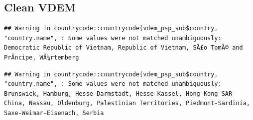 \documentclass[
]{article}
\newenvironment{Shaded}{\begin{snugshade}}{\end{snugshade}}
\newcommand{\CommentTok}[1]{\textcolor[rgb]{0.56,0.35,0.01}{\textit{#1}}}
\newcommand{\DataTypeTok}[1]{\textcolor[rgb]{0.13,0.29,0.53}{#1}}
\newcommand{\KeywordTok}[1]{\textcolor[rgb]{0.13,0.29,0.53}{\textbf{#1}}}
\newcommand{\NormalTok}[1]{#1}
\newcommand{\OperatorTok}[1]{\textcolor[rgb]{0.81,0.36,0.00}{\textbf{#1}}}
\newcommand{\StringTok}[1]{\textcolor[rgb]{0.31,0.60,0.02}{#1}}
\begin{document}
\hypertarget{clean-vdem}{%
\subsection{Clean VDEM}\label{clean-vdem}}

\begin{Shaded}
\end{Shaded}

\begin{verbatim}
## Warning in countrycode::countrycode(vdem_psp_sub$country, "country.name", : Some values were not matched unambiguously: Democratic Republic of Vietnam, Republic of Vietnam, SÃ£o TomÃ© and PrÃ­ncipe, WÃ¼rtemberg
\end{verbatim}

\begin{Shaded}
\end{Shaded}

\begin{verbatim}
## Warning in countrycode::countrycode(vdem_psp_sub$country, "country.name", : Some values were not matched unambiguously: Brunswick, Hamburg, Hesse-Darmstadt, Hesse-Kassel, Hong Kong SAR China, Nassau, Oldenburg, Palestinian Territories, Piedmont-Sardinia, Saxe-Weimar-Eisenach, Serbia
\end{verbatim}
\end{document}
